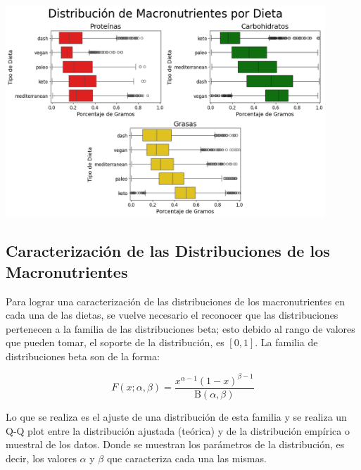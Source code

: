 \documentclass[12pt,a4paper]{article}
\begin{document}
            \begin{center}
                \includegraphics[width=0.90\textwidth]{Resources/2_03_plot_06.png}
            \end{center}
    
    \subsection{Caracterización de las Distribuciones de los Macronutrientes}
        Para lograr una caracterización de las distribuciones de los macronutrientes 
        en cada una de las dietas, se vuelve necesario el reconocer que las distribuciones 
        pertenecen a la familia de las distribuciones beta; esto debido al rango de valores 
        que pueden tomar, el soporte de la distribución, es $[0,1]$. La familia de distribuciones 
        beta son de la forma\cite{beta_distribution}:

        $$F(x;\alpha,\beta) = \frac {x^{\alpha -1}(1-x)^{\beta -1}}{\mathrm {B} (\alpha ,\beta )}$$ 

        Lo que se realiza es el ajuste de una distribución de esta familia y se realiza 
        un Q-Q plot entre la distribución ajustada (teórica) y de la distribución empírica 
        o muestral de los datos. Donde se muestran los parámetros de la distribución, es 
        decir, los valores $\alpha$ y $\beta$ que caracteriza cada una las mismas.\\
\end{document}
